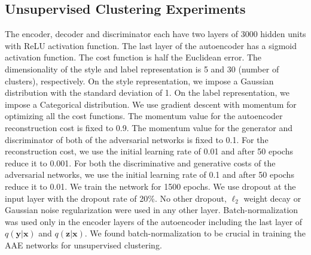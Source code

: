 \documentclass{article}
\begin{document}
\begin{appendices}
\subsection{Unsupervised Clustering Experiments}
The encoder, decoder and discriminator each have two layers of 3000 hidden units with ReLU activation function. The last layer of the autoencoder has a sigmoid activation function. The cost function is half the Euclidean error. The dimensionality of the style and label representation is 5 and 30 (number of clusters), respectively. On the style representation, we impose a Gaussian distribution with the standard deviation of 1. On the label representation, we impose a Categorical distribution. We use gradient descent with momentum for optimizing all the cost functions. The momentum value for the autoencoder reconstruction cost is fixed to 0.9. The momentum value for the generator and discriminator of both of the adversarial networks is fixed to 0.1. For the reconstruction cost, we use the initial learning rate of 0.01 and after 50 epochs reduce it to 0.001. For both the discriminative and generative costs of the adversarial networks, we use the initial learning rate of 0.1 and after 50 epochs reduce it to 0.01. We train the network for 1500 epochs. We use dropout at the input layer with the dropout rate of 20\%. No other dropout, $\ell_2$ weight decay or Gaussian noise regularization were used in any other layer. Batch-normalization was used only in the encoder layers of the autoencoder including the last layer of $q(\mathbf{y}|\mathbf{x})$ and $q(\mathbf{z}|\mathbf{x})$. We found batch-normalization \citep{batch} to be crucial in training the AAE networks for unsupervised clustering.

\end{appendices}
\end{document}
